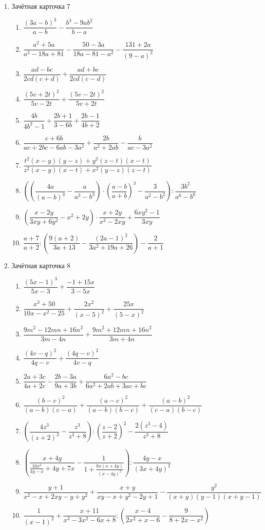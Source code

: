 \documentclass[12pt, a4paper]{article}
\begin{document}
\begin{enumerate}
\begin{enumerate}[label=\asbuk*)]
\end{enumerate}
\item Зачётная карточка 7
\begin{enumerate}[label=\asbuk*)]
	\item \( \dfrac{(3a-b)^3}{a-b}-\dfrac{b^3-9ab^2}{b-a} \)
	\item \( \dfrac{a^2+5a}{a^2-18a+81}-\dfrac{50-3a}{18a-81-a^2}-\dfrac{131+2a}{(9-a)^2} \)
	\item \( \dfrac{ad-bc}{2cd(c+d)}+\dfrac{ad+bc}{2cd(c-d)} \)
	\item \( \dfrac{(5v+2t)^2}{5v-2t}+\dfrac{(5v-2t)^2}{5v+2t} \)
	\item \( \dfrac{4b}{4b^2-1}+\dfrac{2b+1}{3-6b}+\dfrac{2b-1}{4b+2} \)
	\item \( \dfrac{c+6b}{ac+2bc-6ab-3a^2}+\dfrac{2b}{a^2+2ab}-\dfrac{b}{ac-3a^2} \)
	\item \( \dfrac{t^2(x-y)(y-z)+y^2(z-t)(x-t)}{z^2(x-y)(x-t)+x^2(y-z)(z-t)} \)
	\item \( \left( \left( \dfrac{4a}{(a-b)^3} -\dfrac{a}{a^3-b^3}\right)\cdot\left( \dfrac{a-b}{a+b} \right)^3-\dfrac{3}{a^2-b^2} \right):\dfrac{3b^2}{a^6-b^6} \)
	\item \( \left( \dfrac{x-2y}{3xy+6y^2}-x^2+2y \right) \cdot\dfrac{x+2y}{x^2-2xy}+\dfrac{6xy^2-1}{3xy}\)
	\item \( \dfrac{a+7}{a+2}:\left( \dfrac{9(a+2)}{3a+13}-\dfrac{(2a-1)^2}{3a^2+19a+26} \right) -\dfrac{2}{a+1}\)
	\end{enumerate}
\item Зачётная карточка 8
\begin{enumerate}[label=\asbuk*)]
	\item \( \dfrac{(5x-1)^3}{5x-3}+\dfrac{-1+15x}{3-5x} \)
	\item \( \dfrac{x^3+50}{10x-x^2-25}+\dfrac{2x^2}{(x-5)^2}+\dfrac{25x}{(5-x)^2} \)
	\item \( \dfrac{9m^2-12mn+16n^2}{3m-4n}+\dfrac{9m^2+12mn+16n^2}{3m+4n} \)
	\item \( \dfrac{(4v-q)^2}{4q-v}+\dfrac{(4q-v)^2}{4v-q} \)
	\item \( \dfrac{2a+3c}{4a+2c}-\dfrac{2b-3a}{9a+3b}+\dfrac{6a^2-bc}{6a^2+2ab+3ac+bc} \)
	\item \( \dfrac{(b-c)^2}{(a-b)(c-a)}+\dfrac{(a-c)^2}{(a-b)(b-c)}+\dfrac{(a-b)^2}{(c-a)(b-c)} \)
	\item \( \left( \dfrac{4z^3}{(z+2)^3}-\dfrac{z^3}{z^3+8} \right) :\left( \dfrac{z-2}{z+2} \right)^2-\dfrac{2(z^3-4)}{z^3+8}\)
	\item \( \left( \dfrac{x+4y}{\frac{16x^2}{4y-x}+4y+7x} -\dfrac{1}{1+\frac{8x(x+4y)}{(x-4y)^2}}\right):\dfrac{4y-x}{(3x+4y)^2} \)
	\item \( \dfrac{y+1}{x^2-x+2xy-y+y^2}+\dfrac{x+y}{xy-x+y^2-2y+1}-\dfrac{y^2}{(x+y)(y-1)(x+y-1)} \)
	\item \( \dfrac{1}{(x-1)^2}+\dfrac{x+11}{x^3-3x^2-6x+8}:\left( \dfrac{x-4}{2x^2+x-6}-\dfrac{9}{8+2x-x^2} \right) \)
\end{enumerate}
	\end{enumerate}
	
\end{document}
